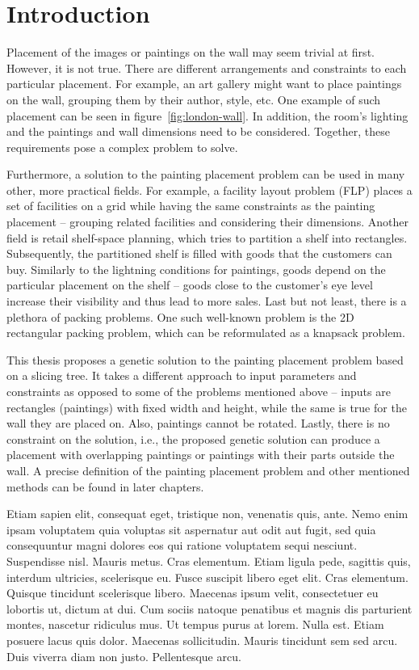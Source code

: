 \chapter{Introduction}\label{ch:introduction}

Placement of the images or paintings on the wall may seem trivial at first.
However, it is not true.
There are different arrangements and constraints to each particular placement.
For example, an art gallery might want to place paintings on the wall, grouping them by their author, style, etc.
One example of such placement can be seen in figure~\ref{fig:london-wall}.
In addition, the room's lighting and the paintings and wall dimensions need to be considered.
Together, these requirements pose a complex problem to solve.

Furthermore, a solution to the painting placement problem can be used in many other, more practical fields.
For example, a facility layout problem (FLP) places a set of facilities on a grid
while having the same constraints as the painting placement – grouping related facilities and considering their dimensions.
Another field is retail shelf-space planning, which tries to partition a shelf into rectangles.
Subsequently, the partitioned shelf is filled with goods that the customers can buy.
Similarly to the lightning conditions for paintings, goods depend on the
particular placement on the shelf – goods close to the customer's eye level increase their visibility and thus lead to more sales.
Last but not least, there is a plethora of packing problems.
One such well-known problem is the 2D rectangular packing problem, which can be reformulated as a knapsack problem.

This thesis proposes a genetic solution to the painting placement problem based on a slicing tree.
It takes a different approach to input parameters and constraints as opposed to some of the
problems mentioned above – inputs are rectangles (paintings) with fixed width and height,
while the same is true for the wall they are placed on. Also, paintings cannot be rotated.
Lastly, there is no constraint on the solution, i.e., the proposed genetic solution can
produce a placement with overlapping paintings or paintings with their parts outside the wall.
A precise definition of the painting placement problem and other mentioned methods can be found in later chapters.

 Etiam sapien elit, consequat eget, tristique non, venenatis quis, ante. Nemo enim ipsam voluptatem quia voluptas sit aspernatur aut odit aut fugit, sed quia consequuntur magni dolores eos qui ratione voluptatem sequi nesciunt. Suspendisse nisl. Mauris metus. Cras elementum. Etiam ligula pede, sagittis quis, interdum ultricies, scelerisque eu. Fusce suscipit libero eget elit. Cras elementum. Quisque tincidunt scelerisque libero. Maecenas ipsum velit, consectetuer eu lobortis ut, dictum at dui. Cum sociis natoque penatibus et magnis dis parturient montes, nascetur ridiculus mus. Ut tempus purus at lorem. Nulla est. Etiam posuere lacus quis dolor. Maecenas sollicitudin. Mauris tincidunt sem sed arcu. Duis viverra diam non justo. Pellentesque arcu.

